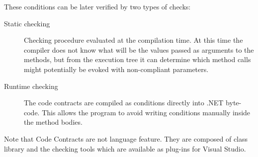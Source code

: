 These conditions can be later verified by two types of checks:

\begin{description}
	\item  [Static checking] Checking procedure evaluated at the compilation time. At this time the compiler does not know what will be the values passed as arguments to the methods, but from the execution tree it can determine which method calls might potentially be evoked with non-compliant parameters.
	\item  [Runtime checking] The code contracts are compiled as conditions directly into .NET byte-code. This allows the program to avoid writing conditions manually inside the method bodies.
\end{description}

Note that Code Contracts are not language feature. They are composed of class library and the checking tools which are available as plug-ins for Visual Studio.